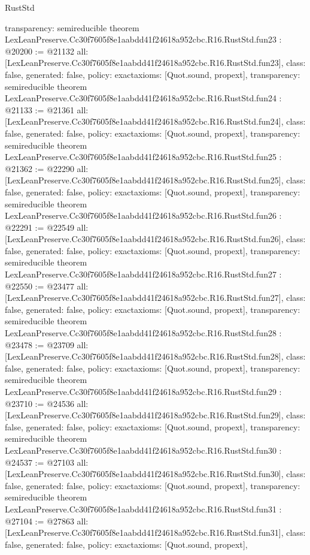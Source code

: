 \begin{lexlean}{RustStd}
\begin{coremodule}
{  transparency: semireducible
}
theorem LexLeanPreserve.Cc30f7605f8e1aabdd41f24618a952cbc.R16.RustStd.fun23 : @20200 := @21132 {
  all: [LexLeanPreserve.Cc30f7605f8e1aabdd41f24618a952cbc.R16.RustStd.fun23],
  class: false,
  generated: false,
  policy: exact{axioms: [Quot.sound, propext]},
  transparency: semireducible
}
theorem LexLeanPreserve.Cc30f7605f8e1aabdd41f24618a952cbc.R16.RustStd.fun24 : @21133 := @21361 {
  all: [LexLeanPreserve.Cc30f7605f8e1aabdd41f24618a952cbc.R16.RustStd.fun24],
  class: false,
  generated: false,
  policy: exact{axioms: [Quot.sound, propext]},
  transparency: semireducible
}
theorem LexLeanPreserve.Cc30f7605f8e1aabdd41f24618a952cbc.R16.RustStd.fun25 : @21362 := @22290 {
  all: [LexLeanPreserve.Cc30f7605f8e1aabdd41f24618a952cbc.R16.RustStd.fun25],
  class: false,
  generated: false,
  policy: exact{axioms: [Quot.sound, propext]},
  transparency: semireducible
}
theorem LexLeanPreserve.Cc30f7605f8e1aabdd41f24618a952cbc.R16.RustStd.fun26 : @22291 := @22549 {
  all: [LexLeanPreserve.Cc30f7605f8e1aabdd41f24618a952cbc.R16.RustStd.fun26],
  class: false,
  generated: false,
  policy: exact{axioms: [Quot.sound, propext]},
  transparency: semireducible
}
theorem LexLeanPreserve.Cc30f7605f8e1aabdd41f24618a952cbc.R16.RustStd.fun27 : @22550 := @23477 {
  all: [LexLeanPreserve.Cc30f7605f8e1aabdd41f24618a952cbc.R16.RustStd.fun27],
  class: false,
  generated: false,
  policy: exact{axioms: [Quot.sound, propext]},
  transparency: semireducible
}
theorem LexLeanPreserve.Cc30f7605f8e1aabdd41f24618a952cbc.R16.RustStd.fun28 : @23478 := @23709 {
  all: [LexLeanPreserve.Cc30f7605f8e1aabdd41f24618a952cbc.R16.RustStd.fun28],
  class: false,
  generated: false,
  policy: exact{axioms: [Quot.sound, propext]},
  transparency: semireducible
}
theorem LexLeanPreserve.Cc30f7605f8e1aabdd41f24618a952cbc.R16.RustStd.fun29 : @23710 := @24536 {
  all: [LexLeanPreserve.Cc30f7605f8e1aabdd41f24618a952cbc.R16.RustStd.fun29],
  class: false,
  generated: false,
  policy: exact{axioms: [Quot.sound, propext]},
  transparency: semireducible
}
theorem LexLeanPreserve.Cc30f7605f8e1aabdd41f24618a952cbc.R16.RustStd.fun30 : @24537 := @27103 {
  all: [LexLeanPreserve.Cc30f7605f8e1aabdd41f24618a952cbc.R16.RustStd.fun30],
  class: false,
  generated: false,
  policy: exact{axioms: [Quot.sound, propext]},
  transparency: semireducible
}
theorem LexLeanPreserve.Cc30f7605f8e1aabdd41f24618a952cbc.R16.RustStd.fun31 : @27104 := @27863 {
  all: [LexLeanPreserve.Cc30f7605f8e1aabdd41f24618a952cbc.R16.RustStd.fun31],
  class: false,
  generated: false,
  policy: exact{axioms: [Quot.sound, propext]},
}
\end{coremodule}
\end{lexlean}
